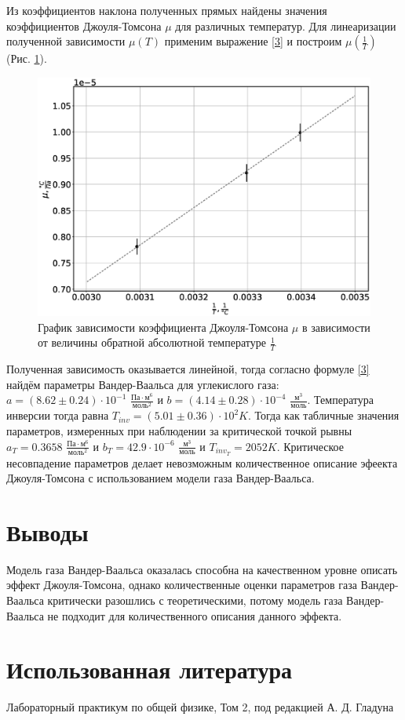 \documentclass[12pt]{article}
\begin{document}
Из коэффициентов наклона полученных прямых найдены значения коэффициентов Джоуля-Томсона $\mu$ для 
различных температур. Для линеаризации полученной зависимости $\mu(T)$ применим выражение \ref{3} и построим 
$\mu(\frac{1}{T})$ (Рис. \ref{fig:3}).
\begin{figure}[H]
    \centering
    \includegraphics[width=0.7\linewidth]{g.eps}
    \caption{График зависимости коэффициента Джоуля-Томсона $\mu$ в зависимости от величины обратной
        абсолютной температуре $\frac{1}{T}$}
    \label{fig:3}
\end{figure}
Полученная зависимость оказывается линейной, тогда согласно формуле \ref{3} найдём параметры 
Вандер-Ваальса для углекислого газа: $a = (8.62 \pm 0.24) \cdot 10 ^ {-1}$ $\frac{\text{Па}\cdot \text{м}^6}{\text{моль}^2}$ и 
$b = (4.14 \pm 0.28) \cdot 10 ^ {-4}$ $\frac{\text{м}^3}{\text{моль}}$. Температура инверсии тогда равна $T_{inv} = (5.01 \pm 0.36) \cdot 10 ^ {2} K$. 
Тогда как табличные значения параметров, измеренных 
при наблюдении за критической точкой рывны $a_T = 0.3658$ $\frac{\text{Па}\cdot \text{м}^6}{\text{моль}^2}$ и 
$b_T = 42.9 \cdot 10^{-6}$ $\frac{\text{м}^3}{\text{моль}}$ и $T_{inv_T} = 2052 K$. Критическое несовпадение 
параметров делает невозможным количественное описание эфеекта Джоуля-Томсона с использованием модели 
газа Вандер-Ваальса.  

\section{Выводы}
Модель газа Вандер-Ваальса оказалась способна на качественном уровне описать эффект Джоуля-Томсона, 
однако количественные оценки параметров газа Вандер-Ваальса критически разошлись с теоретическими, 
потому модель газа Вандер-Ваальса не подходит для количественного описания данного эффекта.

\section{Использованная литература}
\begin{thebibliography}{9}
    Лабораторный практикум по общей физике, Том 2, под редакцией А. Д. Гладуна
\end{thebibliography}
\end{document}
